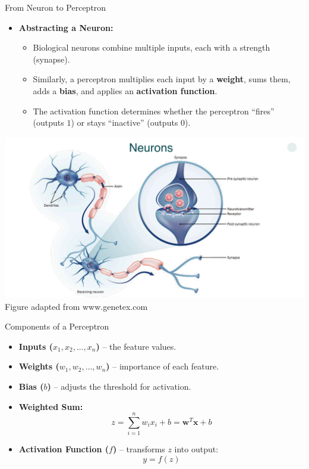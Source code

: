 \documentclass[serif, aspectratio=169]{beamer}
\begin{document}
    \begin{frame}{From Neuron to Perceptron}
         \begin{itemize} \item \textbf{Abstracting a Neuron:} \medskip \begin{itemize}\itemsep1em \item Biological neurons combine multiple inputs, each with a strength (synapse). \item Similarly, a perceptron multiplies each input by a \textbf{weight}, sums them, adds a \textbf{bias}, and applies an \textbf{activation function}. \item The activation function determines whether the perceptron “fires” (outputs \(1\)) or stays “inactive” (outputs \(0\)). \end{itemize} \end{itemize} \endminipage
        \hfill
        \centering
        \includegraphics[width=\linewidth]{pic/Figure_41.png}\\
        \vspace{0.3em}
        \scriptsize Figure adapted from www.genetex.com
        \endminipage

    \end{frame}


    \begin{frame}{Components of a Perceptron}
        \begin{itemize}\itemsep1em
        \item \textbf{Inputs (\(x_1, x_2, \dots, x_n\))} – the feature values.
        \item \textbf{Weights (\(w_1, w_2, \dots, w_n\))} – importance of each feature.
        \item \textbf{Bias (\(b\))} – adjusts the threshold for activation.
        \item \textbf{Weighted Sum:}
        \[
            z = \sum_{i=1}^n w_i x_i + b = \mathbf{w}^T \mathbf{x} + b
        \]
        \item \textbf{Activation Function (\(f\))} – transforms \(z\) into output:
        \[
            y = f(z)
        \]
        \end{itemize}
    \end{frame}
\end{document}
